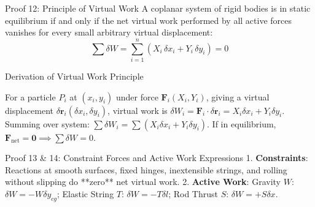 \documentclass[11pt, a4paper]{report}
\begin{document}
\begin{theorembox}{Proof 12: Principle of Virtual Work}
A coplanar system of rigid bodies is in static equilibrium if and only if the net virtual work performed by all active forces vanishes for every small arbitrary virtual displacement:
\begin{equation}
\sum \delta W = \sum_{i=1}^n (X_i \, \delta x_i + Y_i \, \delta y_i) = 0
\end{equation}
\end{theorembox}

\begin{proofbox}{Derivation of Virtual Work Principle}
\begin{center}
\end{center}

For a particle $P_i$ at $(x_i, y_i)$ under force $\mathbf{F}_i(X_i, Y_i)$, giving a virtual displacement $\delta\mathbf{r}_i(\delta x_i, \delta y_i)$, virtual work is $\delta W_i = \mathbf{F}_i \cdot \delta\mathbf{r}_i = X_i \delta x_i + Y_i \delta y_i$. Summing over system: $\sum \delta W_i = \sum (X_i \delta x_i + Y_i \delta y_i)$. If in equilibrium, $\mathbf{F}_{\text{net}} = \mathbf{0} \implies \sum \delta W = 0$.
\end{proofbox}

\begin{theorembox}{Proof 13 \& 14: Constraint Forces and Active Work Expressions}
1. \textbf{Constraints}: Reactions at smooth surfaces, fixed hinges, inextensible strings, and rolling without slipping do **zero** net virtual work.
2. \textbf{Active Work}: Gravity $W$: $\delta W = -W \delta y_{cg}$; Elastic String $T$: $\delta W = -T \delta l$; Rod Thrust $S$: $\delta W = +S \delta x$.
\end{theorembox}
\end{document}
